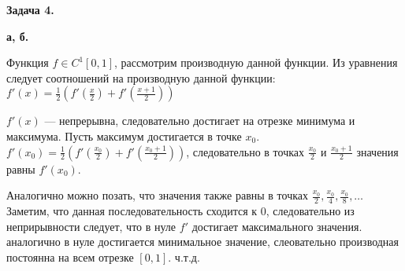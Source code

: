 {\bf Задача 4.}

{\bf а, б.}

Функция $f \in C^{1}[0, 1]$, рассмотрим производную данной функции.
Из уравнения следует соотношений на производную данной функции: \\
$f'(x) = \frac{1}{2} (f'(\frac{x}{2}) + f'(\frac{x + 1}{2}))$

$f'(x)$ --- непрерывна, следовательно достигает на отрезке минимума и максимума. Пусть
максимум достигается в точке $x_0$.
$f'(x_0) = \frac{1}{2} (f'(\frac{x_0}{2}) + f'(\frac{x_0 + 1}{2}))$, следовательно в точках
$\frac{x_0}{2}$ и $\frac{x_0 + 1}{2}$ значения равны $f'(x_0)$.

Аналогично можно позать, что значения также равны в точках $\frac{x_0}{2}, \frac{x_0}{4}, \frac{x_0}{8}, \ldots$
Заметим, что данная последовательность сходится к $0$, следовательно из неприрывности следует, что в нуле $f'$
достигает максимального значения. аналогично в нуле достигается минимальное значение, слеовательно производная постоянна
на всем отрезке $[0, 1]$. ч.т.д.
